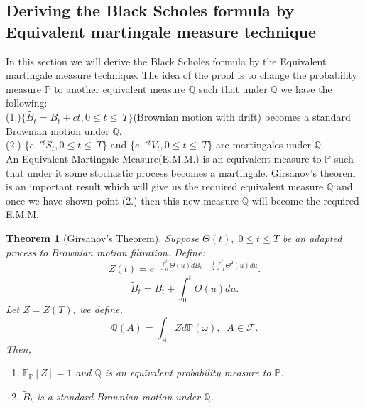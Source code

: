 \documentclass[12pt]{report}
\newtheorem{theorem}{Theorem}[section]
\begin{document}
\subsection{Deriving the Black Scholes formula by Equivalent martingale measure technique}
In this section we will derive the Black Scholes formula by the Equivalent martingale measure technique. The idea of the proof is to change the probability measure $\mathbb{P}$ to another equivalent measure $\mathbb{Q}$ such that under $\mathbb{Q}$ we have the following:\\
(1.)$\{\widetilde{B_{t}} = B_{t} + ct ,0 \leq t \leq\ T \}$(Brownian motion with drift) becomes a standard Brownian motion under $\mathbb{Q}$.\\
(2.) $\{e^{-rt}S_t ,0 \leq t \leq\ T\}$ and $\{e^{-rt}V_t,0 \leq t \leq\ T \}$ are martingales under $\mathbb{Q}$.\\
An Equivalent Martingale Measure(E.M.M.) is an equivalent measure to $\mathbb{P}$ such that under it some stochastic process becomes a martingale. Girsanov's theorem is an important result which will give us the required equivalent measure $\mathbb{Q}$ and once we have shown point (2.) then this new measure $\mathbb{Q}$ will become the required E.M.M.
\begin{theorem}[Girsanov's Theorem]
Suppose $\Theta(t),\;0\leq t \leq T$ be an adapted process to Brownian motion filtration. Define:
$$
Z(t) = e^{-\int_{0}^{t}\Theta(u)dB_u - \frac{1}{2}\int_{0}^{t}\Theta^2(u)du}.
$$
$$
\tilde{B}_t = B_t + \int_{0}^{t}\Theta(u)du.
$$
Let $Z = Z(T)$, we define,
$$
\mathbb{Q}(A) = \int_A Z d\mathbb{P}(\omega),\;\;A\in\mathcal{F}.
$$ 
Then,\\
\begin{enumerate}
    \item $\mathbb{E}_\mathbb{P}[Z] = 1$ and $\mathbb{Q}$ is an equivalent probability measure to $\mathbb{P}.$
    \item $\tilde{B}_t$ is a standard Brownian motion under $\mathbb{Q}$.
\end{enumerate} 
\end{theorem}
\end{document}
